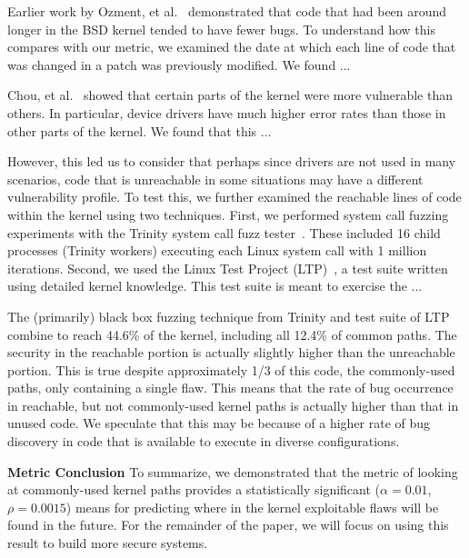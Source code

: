 Earlier work by Ozment, et al.~\cite{ozment2006milk} demonstrated that code that
had been around longer in the BSD kernel tended to have fewer bugs.  To
understand how this compares with our metric, we examined the date at which
each line of code that was changed in a patch was previously modified.  We
found ...



Chou, et al.~\cite{PittSFIeld} showed that certain parts of the kernel
were more vulnerable than others. In particular, device drivers have
much higher error rates than those in other parts of the kernel.
We found that this ...

However, this led us to consider that perhaps since drivers are not used
in many scenarios, code that is unreachable in some situations may have a
different vulnerability profile.  To test this, we
further examined the reachable lines of
code within the kernel using two techniques.  First,
we performed system call fuzzing experiments with the Trinity
system call fuzz tester~\cite{Trinity}. These included 16 child processes
(Trinity workers) executing each Linux system call with 1 million iterations.
Second, we used the Linux Test Project (LTP)~\cite{LTP}, a test suite written
using detailed kernel knowledge.  This test suite is meant to exercise the ...

The (primarily) black box fuzzing technique from Trinity and test suite of
LTP combine to reach 44.6\% of the kernel, including all 12.4\% of common
paths.  The security in the reachable portion is actually
slightly higher than the unreachable portion.  This is true despite
approximately 1/3 of this code, the commonly-used paths, only containing
a single flaw.  This means that the rate of bug occurrence in reachable, but
not commonly-used kernel paths is actually higher than that in unused
code.  We speculate that this may be because of a higher rate of bug discovery
in code that is available to execute in diverse configurations.


\textbf{Metric Conclusion}
To summarize, we demonstrated that the metric of looking at commonly-used
kernel paths provides a statistically significant ($\alpha=0.01$,
$\rho=0.0015$) means for predicting where in the kernel exploitable flaws
will be found in the future.  For the remainder of the paper, we will
focus on using this result to build more secure systems.


